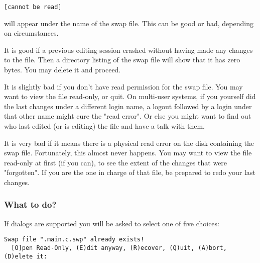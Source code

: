 \begin{Verbatim}[samepage=true]
    [cannot be read] 
\end{Verbatim}

will appear under the name of the swap file.
This can be good or bad, depending on circumstances.

It is good if a previous editing session crashed without having made any changes to the file.
Then a directory listing of the swap file will show that it has zero bytes.
You may delete it and proceed.

It is slightly bad if you don't have read permission for the swap file.
You may want to view the file read-only, or quit.
On multi-user systems, if you yourself did the last changes under a different login name, a logout followed by a login under that other name might cure the "read error".
Or else you might want to find out who last edited (or is editing) the file and have a talk with them.

It is very bad if it means there is a physical read error on the disk containing the swap file.
Fortunately, this almost never happens.
You may want to view the file read-only at first (if you can), to see the extent of the changes that were "forgotten".
If you are the one in charge of that file, be prepared to redo your last changes.
\subsubsection{What to do?}
\label{swap-exists-choices}
If dialogs are supported you will be asked to select one of five choices:

\begin{Verbatim}[samepage=true]
  Swap file ".main.c.swp" already exists! 
  [O]pen Read-Only, (E)dit anyway, (R)ecover, (Q)uit, (A)bort, (D)elete it: 
\end{Verbatim}

